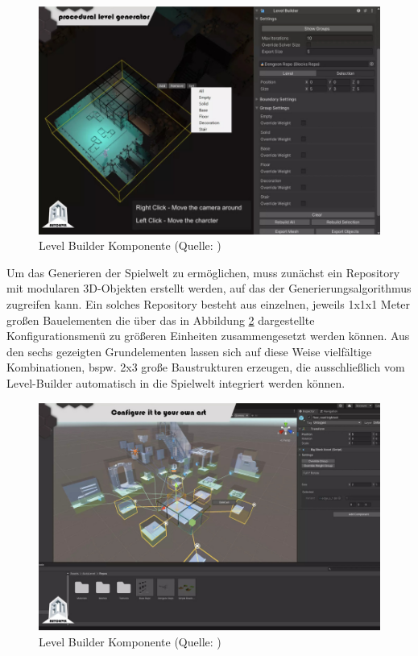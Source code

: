 \begin{figure}[ht]
\centering
\includegraphics[width=1\linewidth]{content/pictures/FirstSteps01.png}
\caption{Level Builder Komponente (Quelle: \citealp{alasl_autolevel_2022})}
\label{fig:level_builder_edit}
\end{figure}

Um das Generieren der Spielwelt zu ermöglichen, muss zunächst ein Repository mit modularen \ac{3D}-Objekten erstellt werden, auf das der Generierungsalgorithmus zugreifen kann. Ein solches Repository besteht aus einzelnen, jeweils 1x1x1 Meter großen Bauelementen die über das in Abbildung \ref{fig:repository-generator} dargestellte Konfigurationsmenü zu größeren Einheiten zusammengesetzt werden können. Aus den sechs gezeigten Grundelementen lassen sich auf diese Weise vielfältige Kombinationen, bspw. 2x3 große Baustrukturen erzeugen, die ausschließlich vom Level-Builder automatisch in die Spielwelt integriert werden können.

\begin{figure}[ht]
\centering
\includegraphics[width=1\linewidth]{content/pictures/FirstSteps02.png}
\caption{Level Builder Komponente (Quelle: \citealp{alasl_autolevel_2022})}
\label{fig:repository-generator}
\end{figure}

